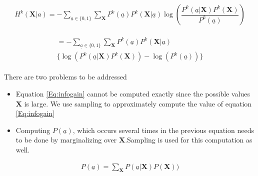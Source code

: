 \documentclass[10pt,twocolumn,letterpaper]{article}
\begin{document}
\begin{align}
H^{k}(\textbf{X}| a)= -\sum_{\underline{a}\in\lbrace 0 ,1 \rbrace} \sum_{\textbf{X}} P^{k}( \underline{a})P^{k}(\textbf{X}| \underline{a}) \log(\dfrac{P^{k}( \underline{a}|\textbf{X})P^{k}(\textbf{X})}{P^{k}( \underline{a})})
\end{align}

\begin{align}
\label{Eq:infogain}
\begin{split}
 = -\sum_{\underline{a}\in\lbrace 0 ,1 \rbrace} \sum_{\textbf{X}} P^{k}( \underline{a})  P^{k}(\textbf{X}| \underline{a}) \\ \Big\lbrace\log(P^{k}( \underline{a}|\textbf{X})P^{k}(\textbf{X})) - \log(P^{k}( \underline{a}))\Big\rbrace
\end{split}
\end{align}

There are two problems to be addressed
\begin{itemize}

\item Equation {\ref{Eq:infogain} cannot be computed exactly since the possible values $\textbf{X}$ is large. We use sampling to approximately compute the value of equation \ref{Eq:infogain}}

\item{Computing $P( \underline{a})$, which occurs several times in the previous equation needs to be done by marginalizing over $\textbf{X}$.Sampling is used for this computation as well.} 
\end{itemize}

\begin{align}
 P(\underline{a}) = \sum_{\textbf{X}}P( \underline{a}|\textbf{X})P(\textbf{X}))
\end{align}
\end{document}
